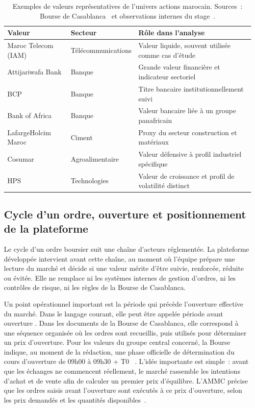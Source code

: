 \begin{table}[H]
\centering
\caption{Exemples de valeurs représentatives de l'univers actions marocain.
Sources~: Bourse de Casablanca~\cite{bourse_casablanca_masi,bourse_casablanca_indices}
et observations internes du stage~\cite{rapport_s1}.}
\label{tab:grandes_cap}
\begin{tabularx}{\linewidth}{@{}lYY@{}}
\toprule
\textbf{Valeur} & \textbf{Secteur} & \textbf{Rôle dans l'analyse} \\
\midrule
Maroc Telecom (IAM)         & Télécommunications & Valeur liquide, souvent utilisée comme cas d'étude \\
Attijariwafa Bank           & Banque             & Grande valeur financière et indicateur sectoriel \\
BCP                         & Banque             & Titre bancaire institutionnellement suivi \\
Bank of Africa              & Banque             & Valeur bancaire liée à un groupe panafricain \\
LafargeHolcim Maroc         & Ciment             & Proxy du secteur construction et matériaux \\
Cosumar                     & Agroalimentaire    & Valeur défensive à profil industriel spécifique \\
HPS                         & Technologies       & Valeur de croissance et profil de volatilité distinct \\
\bottomrule
\end{tabularx}
\end{table}

\subsection{Cycle d'un ordre, ouverture et positionnement de la plateforme}

Le cycle d'un ordre boursier suit une chaîne d'acteurs réglementée. La plateforme
développée intervient avant cette chaîne, au moment où l'équipe prépare une lecture
du marché et décide si une valeur mérite d'être suivie, renforcée, réduite ou évitée.
Elle ne remplace ni les systèmes internes de gestion d'ordres, ni les contrôles de
risque, ni les règles de la Bourse de Casablanca.

Un point opérationnel important est la période qui précède l'ouverture effective du
marché. Dans le langage courant, elle peut être appelée \og période avant ouverture \fg{}.
Dans les documents de la Bourse de Casablanca, elle correspond à une séquence organisée
où les ordres sont recueillis, puis utilisés pour déterminer un prix d'ouverture. Pour
les valeurs du groupe central concerné, la Bourse indique, au moment de la rédaction,
une phase officielle de détermination du cours d'ouverture de 09h00 à 09h30 + T0
~\cite{bourse_casablanca_horaires}. L'idée importante est simple~: avant que les échanges
ne commencent réellement, le marché rassemble les intentions d'achat et de vente afin
de calculer un premier prix d'équilibre. L'AMMC précise que les ordres saisis avant
l'ouverture sont exécutés à ce prix d'ouverture, selon les prix demandés et les quantités
disponibles~\cite{ammc_modalites_seance}.

